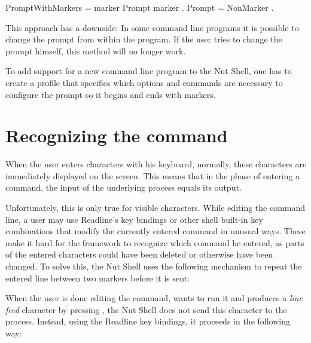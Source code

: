 \documentclass[paper=a4,twoside,abstract=on,cleardoublepage=empty,numbers=noenddot,toc=bib,toc=listof,12pt,appendixprefix=true]{scrreprt}
\begin{document}
\begin{ebnf}
PromptWithMarkers = marker Prompt marker .
Prompt = { NonMarker } .
\end{ebnf}
%
This approach has a downside: In some command line programs it is possible to change the prompt from within the program. If the user tries to change the prompt himself, this method will no longer work.

To add support for a new command line program to the Nut Shell, one has to create a profile that specifies which options and commands are necessary to configure the prompt so it begins and ends with markers.


\section{Recognizing the command}
\label{sec:reccmd}

When the user enters characters with his keyboard, normally, these characters are immediately displayed on the screen. This means that in the phase of entering a command, the input of the underlying process equals its output.

Unfortunately, this is only true for visible characters. While editing the command line, a user may use Readline's key bindings or other shell built-in key combinations that modify the currently entered command in unusual ways. These make it hard for the framework to recognize which command he entered, as parts of the entered characters could have been deleted or otherwise have been changed. To solve this, the Nut Shell uses the following mechanism to repeat the entered line between two markers before it is sent:

When the user is done editing the command, wants to run it and produces a \emph{line feed} character by pressing , the Nut Shell does not send this character to the process. Instead, using the Readline key bindings, it proceeds in the following way:
\end{document}
